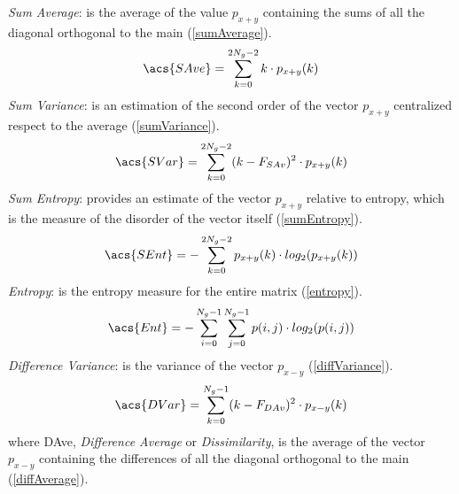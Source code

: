\documentclass[final,a4paper,12pt,english]{UnicaPhdThesis3}
\begin{document}
\textit{Sum Average}: is the average of the value $p_{x+y}$ containing the sums of all the diagonal orthogonal to the main (\ref{sumAverage}).
\begin{equation}\label{sumAverage}
\acs{SAve}=\sum_{k=0}^{2N_{g}-2}k\cdot p_{x+y}(k)
\end{equation}
\textit{Sum Variance}: is an estimation of the second order of the vector $p_{x+y}$ centralized respect to the average (\ref{sumVariance}).
\begin{equation}\label{sumVariance}
\acs{SVar}=\sum_{k=0}^{2N_{g}-2}(k - F_{SAv})^2 \cdot p_{x+y}(k)
\end{equation}
\textit{Sum Entropy}: provides an estimate of the vector $p_{x+y}$ relative to entropy, which is the measure of the disorder of the vector itself (\ref{sumEntropy}).
\begin{equation}\label{sumEntropy}
\acs{SEnt}=-\sum_{k=0}^{2N_{g}-2}p_{x+y}(k)\cdot log_2(p_{x+y}(k))
\end{equation}
\textit{Entropy}: is the entropy measure for the entire matrix (\ref{entropy}).
\begin{equation}\label{entropy}
\acs{Ent}=-\sum_{i=0}^{N_{g}-1}\sum_{j=0}^{N_{g}-1} p(i,j)\cdot log_2(p(i,j))
\end{equation}
\textit{Difference Variance}: is the variance of the vector $p_{x-y}$ (\ref{diffVariance}).
\begin{equation}\label{diffVariance}
\acs{DVar}=\sum_{k=0}^{N_{g}-1}(k - F_{DAv})^2 \cdot p_{x-y}(k)
\end{equation}
where \acs{DAve}, \textit{Difference Average} or \textit{Dissimilarity}, is the average of the vector $p_{x-y}$ containing the differences of all the diagonal orthogonal to the main (\ref{diffAverage}).
\end{document}
